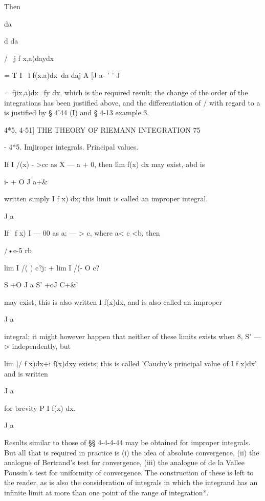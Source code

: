 Then



da



d da



/ \ j f x,a)daydx\

= T I \ l f(x.a)dx\ da daj A [J a- ' ' J

= fjix,a)dx=fy dx, which is the required result; the change of the
order of the integrations has been justified above, and the
differentiation of / with regard to a is justified by § 4'44 (I) and §
4-13 example 3.



4*5, 4-51] THE THEORY OF RIEMANN INTEGRATION 75

- 4*5. Imjiroper integrals. Principal values.

If I /(x) - >cc as X — a + 0, then lim f(x) dx may exist, abd is

i- + O J a+\&

written simply I f x) dx; this limit is called an improper integral.

J a

If \ f x) I — 00 as a; — > c, where a< c <b, then

/•e-5 rb

lim I /( ) c?j: + lim I /(- O c?

S +O J a S' +oJ C+\&'

may exist; this is also written I f(x)dx, and is also called an
improper

J a

integral; it might however happen that neither of these limits exists
when 8, S' — > independently, but

lim ]/ f x)dx+i f(x)dxy exists; this is called 'Cauchy's principal
value of I f x)dx' and is written

J a

for brevity P I f(x) dx.

J a

Results similar to those of §§ 4-4-4-44 may be obtained for improper
integrals. But all that is required in practice is (i) the idea of
absolute convergence, (ii) the analogue of Bertrand's test for
convergence, (iii) the analogue of de la Vallee Poussin's test for
uniformity of convergence. The construction of these is left to the
reader, as is also the consideration of integrals in which the
integrand has an infinite limit at more than one point of the range of
integration*.



